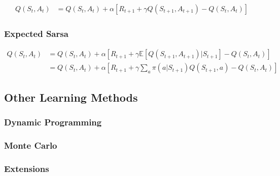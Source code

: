 \documentclass[result.tex]{subfiles}
\begin{document}
    \begin{align*}
        Q(S_t, A_t) &=
        Q(S_t , A_t) +
        \alpha \left[
        R_{t + 1} +
        \gamma Q(S_{t + 1}, A_{t + 1}) - Q(S_t, A_t)
        \right]
    \end{align*}

    \subsubsection*{Expected Sarsa}

    \begin{align*}
        Q(S_t, A_t) &=
        Q(S_t , A_t) +
        \alpha \left[
        R_{t + 1} +
        \gamma \mathbb{E} \left[ Q(S_{t + 1}, A_{t + 1}) | S_{t + 1}
        \right] -
        Q(S_t, A_t)
        \right] \\
        &=
        Q(S_t , A_t) +
        \alpha \left[
        R_{t + 1} +
        \gamma \sum_a \pi (a | S_{t + 1}) Q(S_{t + 1}, a) -
        Q(S_t, A_t)
        \right]
    \end{align*}

    \subsection*{Other Learning Methods}

    \subsubsection*{Dynamic Programming}

    \subsubsection*{Monte Carlo}

    \subsubsection*{Extensions}
\end{document}
